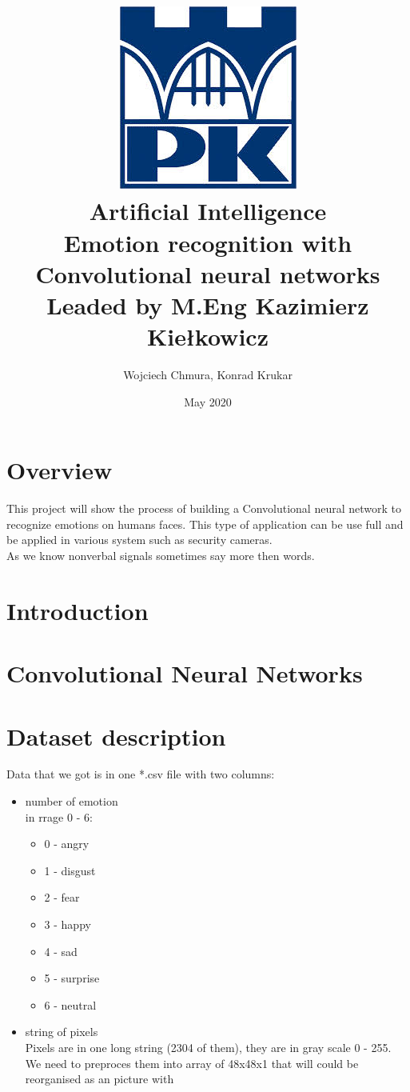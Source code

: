 \documentclass{article}
\title{
    {\includegraphics{images.jpg}}\\
    {Artificial Intelligence}\\
    {\large Emotion recognition with Convolutional neural networks}\\
     \small Leaded by M.Eng Kazimierz Kiełkowicz
    }
\author{Wojciech Chmura, Konrad Krukar}
\date{May 2020}
\begin{document}
    \maketitle
    \newpage
    \tableofcontents
    \newpage
    
    \section{Overview}
    This project will show the process of building a Convolutional  neural network to recognize emotions on humans faces.
    This type of application can be use full and be applied  in various system such as security cameras. \\ 
    As we know nonverbal signals sometimes say more then words.
    
    \section{Introduction}
    
    \section{Convolutional Neural Networks}
    
    \section{Dataset description}
    Data that we got is in one *.csv file with two columns: \\
    \begin{itemize}
      \item number of emotion \\
        in rrage 0 - 6:
        \begin{itemize}
            \item 0 - angry
            \item 1 - disgust
            \item 2 - fear
            \item 3 - happy
            \item 4 - sad
            \item 5 - surprise
            \item 6 - neutral
        \end{itemize}
      \item string of pixels \\
        Pixels are in one long string (2304 of them), they are in gray scale 0 - 255.
        We need to preproces them into array of 48x48x1 that will could be reorganised as an picture with 
    \end{itemize}
    
\end{document}
